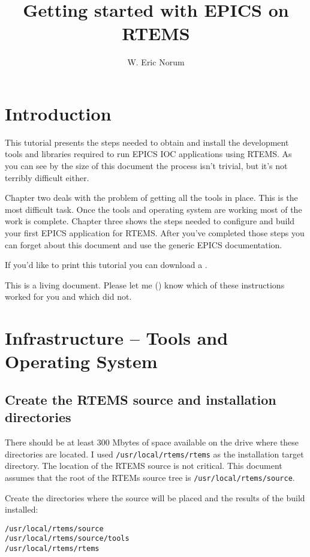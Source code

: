 \documentclass{report}
\title{Getting started with EPICS on RTEMS}
\author{W. Eric Norum}
\begin{document}
\maketitle
\newpage
{}
\tableofcontents
\newpage
{}

\chapter{Introduction}
This tutorial presents the steps needed to obtain and install
the development tools and
libraries required  to run EPICS IOC applications using RTEMS.
As you can see by the size of this document the process isn't trivial,
but it's not terribly difficult either.

Chapter two deals with the problem of getting all the tools in place.  This
is the most difficult task.  Once the tools and operating system are working
most of the work is complete.  Chapter three shows the steps needed to
configure and build your first EPICS application for RTEMS.  After you've
completed those steps you can forget about this document and use the
generic EPICS documentation.

\begin{htmlonly}
If you'd like to print this tutorial you can download a
.
\end{htmlonly}


This is a living document.  Please let me
()
know which of these instructions worked for you and which did not.


\chapter{Infrastructure -- Tools and Operating System}
\section{Create the RTEMS source and installation directories}
There should be at least 300 Mbytes of space available on the drive
where these directories are located.
I used {\tt /usr/local/rtems/rtems\rtemsVersion} as the
installation target directory.
The location of the RTEMS source is not critical.  This document assumes
that the root of the RTEMs source tree is {\tt /usr/local/rtems/source}.

Create the directories where the source will be placed
and the results of the build installed:
\begin{alltt}
/usr/local/rtems/source
/usr/local/rtems/source/tools
/usr/local/rtems/rtems\rtemsVersion
\end{alltt}
\end{document}

